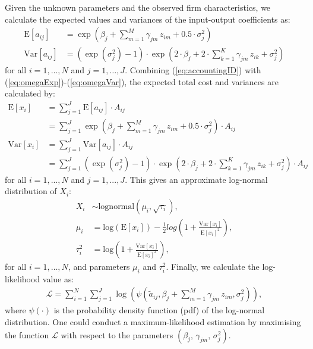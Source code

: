 \documentclass[12pt]{article}
\begin{document}
Given the unknown parameters and the observed firm characteristics, we calculate the expected values and  variances of the input-output coefficients as:
\begin{align}
    \text{E}[a_{ij}]
    & =\exp (\beta_j+\sum_{m=1}^M \gamma_{jm} \, z_{im} +        
    0.5\cdot \sigma_{j}^2) 
    \label{eq:omegaExp} \\
    \text{Var}[a_{ij}]
    & =(\exp(\sigma_{j}^2)-1) \cdot \exp(2\cdot\beta_j +
    2\cdot\sum_{k=1}^K\gamma_{jm} \, z_{ik}+\sigma_{j}^2)
    \label{eq:omegaVar}
\end{align}
for all $i=1,\ldots,N$ and $j=1,\ldots,J$. 
Combining (\ref{eq:accountingID}) with (\ref{eq:omegaExp})-(\ref{eq:omegaVar}), the expected total cost and variances are calculated by:
\begin{align}
    \text{E}[x_i]
    & = \sum_{j=1}^J \text{E}[a_{ij}] \cdot A_{ij} \\
    & = \sum_{j=1}^J \exp (\beta_j +\sum_{m=1}^M \gamma_{jm} \, z_{im} + 0.5\cdot \sigma_{j}^2) \cdot A_{ij}
    \label{eq:yExp} \\
    \text{Var}[x_i]
    & = \sum_{j=1}^J \text{Var}[a_{ij}] \cdot A_{ij} \\
    & = \sum_{j=1}^J (\exp(\sigma_{j}^2)-1) \cdot \exp(2\cdot\beta_j + 2\cdot\sum_{k=1}^K\gamma_{jm} \, z_{ik}+\sigma_{j}^2) \cdot A_{ij}
    \label{eq:yVar} 
\end{align}
for all $i=1,...,N$ and $j=1,...,J.$ 
This gives an approximate log-normal distribution of $X_i$:
\begin{align}
    X_i 
    & \sim \text{lognormal} (\mu_i,\sqrt{\tau_i}), \, \\
    \mu_i 
    & = \text{log}(\text{E}[x_i])-\frac{1}{2}log(1+\frac{\text{Var}[x_i]}{\text{E}[x_i]^2}), \\
    \tau_i^2 
    & = \text{log}(1+\frac{\text{Var}[x_i]}{\text{E}[x_i]^2}),
    \label{eq:yMu&yTau}
\end{align}
for all $i=1,\ldots,N$, and parameters $\mu_i$ and $\tau_i^2$.
Finally, we calculate the log-likelihood value as:
\begin{align}
    \mathcal{L} = \sum_{i=1}^N \sum_{j=1}^J \log \left( \psi \left( \tilde{a}_{ij}, \beta_j+\sum_{m=1}^M \gamma_{jm} \, z_{im},
    \sigma_{j}^2 \right) \right),
\end{align}
where $\psi(\cdot)$ is the probability density function (pdf) of 
the log-normal distribution. 
One could conduct a maximum-likelihood estimation by maximising the function $\mathcal{L}$ with respect to the parameters $(\beta_j, \, \gamma_{jm}, \,\sigma_j^2)$. 
\end{document}
